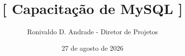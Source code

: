 \newcommand{\bloco}[4]{%
\begin{frame}[plain]
  \vfill
  \begin{center}
    {\lexendlight\textcolor{lightpurple}{\Large BLOCO #1}}

    \vspace{0.8em}
    {\fontsize{26}{32}\selectfont\textbf{\textcolor{white}{#2}}}

    \vspace{1.5em}
    \textcolor{lightpurple}{\rule{0.35\linewidth}{2pt}}

    \vspace{1.2em}
    {\lexendsemibold\textcolor{yellow}{\large #3 \quad · \quad #4}}
  \end{center}
  \vfill
\end{frame}}

\ifdefined\COMNOTAS
\fi

\title{{\Huge \textcolor{lightpurple}{\textbf{[}} \textbf{Capacitação de MySQL} \textcolor{lightpurple}{\textbf{]}}}}
\author{{\normalsize Ronivaldo D. Andrade - Diretor de Projetos}}
\date{{\normalsize 27 de agosto de 2026}}
